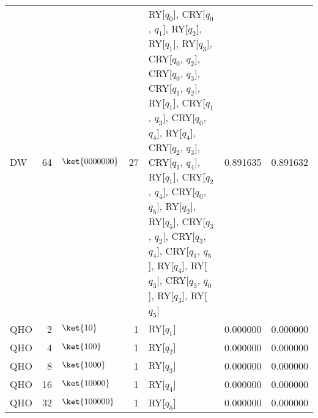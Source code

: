 \begin{tabular}{lrlrlrr}
DW & 64 & $\ket{0000000}$ & 27 & RY[$q_0$], CRY[$q_0$, $q_1$], RY[$q_2$], RY[$q_1$], RY[$q_3$], CRY[$q_0$, $q_2$], CRY[$q_0$, $q_3$], CRY[$q_1$, $q_2$], RY[$q_1$], CRY[$q_1$, $q_3$], CRY[$q_0$, $q_4$], RY[$q_4$], CRY[$q_2$, $q_3$], CRY[$q_1$, $q_4$], RY[$q_1$], CRY[$q_2$, $q_4$], CRY[$q_0$, $q_5$], RY[$q_2$], RY[$q_5$], CRY[$q_3$, $q_2$], CRY[$q_3$, $q_4$], CRY[$q_1$, $q_5$], RY[$q_4$], RY[$q_3$], CRY[$q_3$, $q_0$], RY[$q_3$], RY[$q_5$] & 0.891635 & 0.891632 \\
QHO & 2 & $\ket{10}$ & 1 & RY[$q_1$] & 0.000000 & 0.000000 \\
QHO & 4 & $\ket{100}$ & 1 & RY[$q_2$] & 0.000000 & 0.000000 \\
QHO & 8 & $\ket{1000}$ & 1 & RY[$q_3$] & 0.000000 & 0.000000 \\
QHO & 16 & $\ket{10000}$ & 1 & RY[$q_4$] & 0.000000 & 0.000000 \\
QHO & 32 & $\ket{100000}$ & 1 & RY[$q_5$] & 0.000000 & 0.000000 \\
\bottomrule
\end{tabular}
